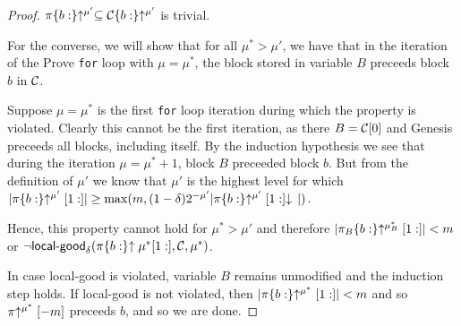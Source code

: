 \begin{proof}
    $\pi\{b:\}\negthickspace\uparrow^{\mu'} \subseteq \mathcal{C}\{b:\}\negthickspace\uparrow^{\mu'}$ is trivial.

    For the converse, we will show that for all $\mu^* > \mu'$, we have that in
    the iteration of the Prove \texttt{for} loop with $\mu = \mu^*$, the block
    stored in variable $B$ preceeds block $b$ in $\mathcal{C}$.

    Suppose $\mu = \mu^*$ is the first \texttt{for} loop iteration during which the
    property is violated. Clearly this cannot be the first iteration, as there
    $B = \mathcal{C}[0]$ and Genesis preceeds all blocks, including itself. By the
    induction hypothesis we see that during the iteration $\mu = \mu^* + 1$,
    block $B$ preceeded block $b$. But from the definition of $\mu'$ we know
    that $\mu'$ is the highest level for which
    $|\pi\{b:\}\negthickspace\uparrow^{\mu'}[1:]|
    \geq \max(m, (1 -
    \delta)2^{-\mu'}|\pi\{b:\}\negthickspace\uparrow^{\mu'}[1:]\negthickspace\downarrow\,|)$.

    Hence, this
    property cannot hold for $\mu^* > \mu'$ and therefore
    $|\pi_B\{b:\}\negthickspace\uparrow^{\mu_B^*}[1:]| < m$ or $\lnot
    \textsf{local-good}_\delta(\pi\{b:\}\negthickspace\uparrow{\mu^*}[1:], \mathcal{C}, \mu^*)$.

    In case \textsf{local-good} is violated, variable $B$ remains unmodified and
    the induction step holds. If \textsf{local-good} is not violated, then
    $|\pi\{b:\}\negthickspace\uparrow^{\mu^*}[1:]| < m$ and so $\pi\negthickspace\uparrow^{\mu^*}[-m]$
    preceeds $b$, and so we are done.
    \Qed
\end{proof}
